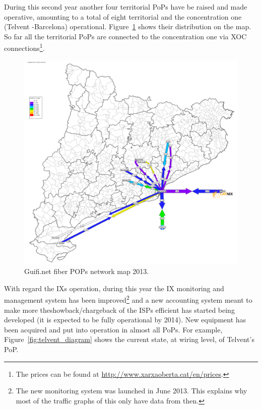 During this second year another four territorial PoPs have be raised and made operative, amounting to a total of eight territorial and the concentration one (Telvent -Barcelona) operational. Figure~\ref{fig:pop_weathermap} shows their distribution on the map. So far all the territorial PoPs are connected to the concentration one via XOC connections\footnote{The prices can be found at \url{http://www.xarxaoberta.cat/en/prices}.}.

\begin{figure}[H]
  \centering
  \includegraphics[width=0.95\linewidth]{sect3/figures/weathermap.png} 
  \caption[Guifi.net fiber POPs network map 2013]{Guifi.net fiber POPs network map 2013.}
  \label{fig:pop_weathermap}
\end{figure}

With regard the IXs operation, during this year the IX monitoring and management system has been improved\footnote{The new monitoring system was launched in June 2013. This explains why most of the traffic graphs of this only have data from then.} and a new accounting system meant to make more theshowback/chargeback of the ISPs efficient has started being developed (it is expected to be fully operational by 2014). New equipment has been acquired and put into operation in almost all PoPs. For example, Figure~\ref{fig:telvent_diagram} shows the current state, at wiring level, of Telvent's PoP.

